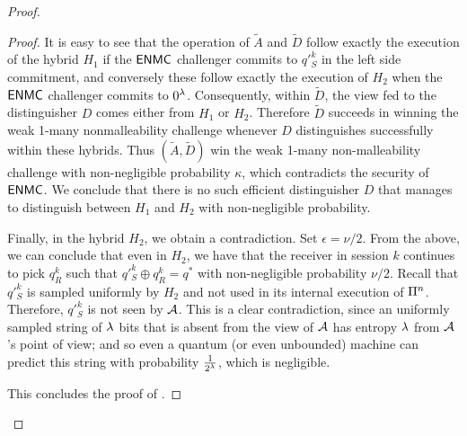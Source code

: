 \begin{proof}
\begin{proof}
        It is easy to see that the operation of $\tilde{A}$ and $\tilde{D}$ follow exactly the execution of the hybrid $H_1$ if the $\mathsf{ENMC}$ challenger commits to $q'^k_S$ in the left side commitment, and conversely these follow exactly the execution of $H_2$ when the $\mathsf{ENMC}$ challenger commits to $0^\lambda$. Consequently, within $\tilde{D}$, the view fed to the distinguisher $D$ comes either from $H_1$ or $H_2$. Therefore $\tilde{D}$ succeeds in winning the weak 1-many nonmalleability challenge whenever $D$ distinguishes successfully within these hybrids. Thus $(\tilde{A},\tilde{D})$ win the weak 1-many non-malleability challenge with non-negligible probability $\kappa$, which contradicts the security of $\mathsf{ENMC}$. We conclude that there is no such efficient distinguisher $D$ that manages to distinguish between $H_1$ and $H_2$ with non-negligible probability. 

        Finally, in the hybrid $H_2$, we obtain a contradiction. Set $\epsilon = \nu/2$. From the above, we can conclude that even in $H_2$, we have that the receiver in session $k$ continues to pick $q^k_R$ such that $q'^k_S \oplus q^k_R = q^*$ with non-negligible probability $\nu/2$. Recall that $q'^k_S$ is sampled uniformly by $H_2$ and not used in its internal execution of $\mathrm{\Pi}^n$. Therefore, $q'^k_S$ is not seen by $\mathcal{A}$. This is a clear contradiction, since an uniformly sampled string of $\lambda$ bits that is absent from the view of $\mathcal{A}$ has entropy $\lambda$ from $\mathcal{A}$'s point of view; and so even a quantum (or even unbounded) machine can predict this string with probability $\frac{1}{2^\lambda}$, which is negligible. 
        

        This concludes the proof of .

    \end{proof}



\end{proof}
